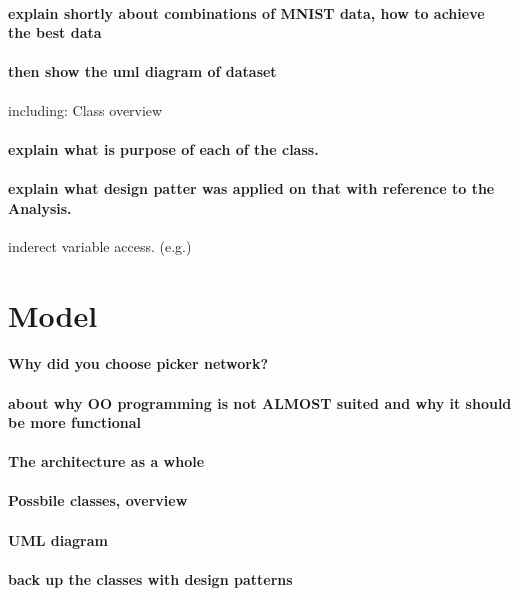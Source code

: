 \paragraph{
	explain shortly about combinations of MNIST data, how to achieve the best data
}

\paragraph{then show the uml diagram of dataset}
including: Class overview

\paragraph{explain what is purpose of each of the class. }

\paragraph{explain what design patter was applied on that with reference to
the Analysis.}

inderect variable access. (e.g.)

\section{Model}
\label{sec:design_model}

\paragraph{Why did you choose picker network?}
\paragraph{about why OO programming is not ALMOST suited and why it should be more functional}
\paragraph{The architecture as a whole}
\paragraph{Possbile classes, overview}
\paragraph{UML diagram}
\paragraph{back up the classes with design patterns}

